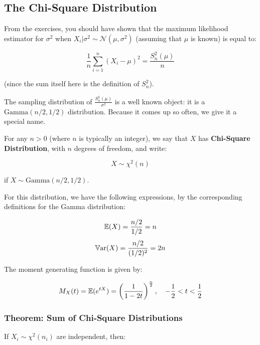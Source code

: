 \documentclass[a4paper]{article}
\begin{document}
        \subsection{The Chi-Square Distribution}
            \begin{fread}
                [DS14, section 8.2]
            \end{fread}

            From the exercises, you should have shown that the maximum
            likelihood estimator for $\sigma^2$ when $X_i | \sigma^2 \sim
            \mathcal{N}(\mu, \sigma^2)$ (assuming that $\mu$ is known) is equal
            to:

            \[
                \frac{1}{n} \sum_{i=1}^n (X_i - \mu)^2 = \frac{S_n^2(\mu)}{n}
            \]

            (since the sum itself here is the definition of $S_n^2$).

            The sampling distribution of $\frac{S_n^2(\mu)}{\sigma^2}$ is a well
            known object: it is a $\text{Gamma}(n/2, 1/2)$ distribution. Because
            it comes up so often, we give it a special name.

            \begin{definition}
                For any $n > 0$ (where $n$ is typically an integer), we say that
                $X$ has \textbf{Chi-Square Distribution}, with $n$ degrees of
                freedom, and write:

                \[
                    X \sim \chi^2(n)
                \]

                if $X \sim \text{Gamma}(n/2, 1/2)$.

                For this distribution, we have the following expressions, by the
                corresponding definitions for the Gamma distribution:

                \[
                    \mathbb{E}(X) = \frac{n/2}{1/2} = n
                \]
                \[
                    \mathbb{V}\text{ar}(X) = \frac{n/2}{(1/2)^2} = 2n
                \]

                The moment generating function is given by:

                \[
                    M_X(t) = \mathbb{E}(e^{tX}) = \left(\frac{1}{1 - 2t}\right)
                    ^\frac{n}{2}, \quad -\frac{1}{2} < t < \frac{1}{2}
                \]
            \end{definition}

            \subsubsection{Theorem: Sum of Chi-Square Distributions}
                If $X_i \sim \chi^2(n_i)$ are independent, then:
\end{document}
